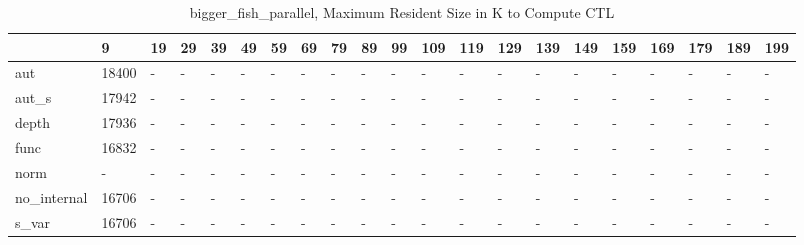 \begin{table}
\caption{bigger_fish_parallel, Maximum Resident Size in K to Compute CTL}
\label{bigger_fish_parallel_CTL_size}
\begin{tabular}{lllllllllllllllllllll}
\toprule
 & 9 & 19 & 29 & 39 & 49 & 59 & 69 & 79 & 89 & 99 & 109 & 119 & 129 & 139 & 149 & 159 & 169 & 179 & 189 & 199 \\
\midrule
aut & 18400 & - & - & - & - & - & - & - & - & - & - & - & - & - & - & - & - & - & - & - \\
aut_s & 17942 & - & - & - & - & - & - & - & - & - & - & - & - & - & - & - & - & - & - & - \\
depth & 17936 & - & - & - & - & - & - & - & - & - & - & - & - & - & - & - & - & - & - & - \\
func & 16832 & - & - & - & - & - & - & - & - & - & - & - & - & - & - & - & - & - & - & - \\
norm & - & - & - & - & - & - & - & - & - & - & - & - & - & - & - & - & - & - & - & - \\
no_internal & 16706 & - & - & - & - & - & - & - & - & - & - & - & - & - & - & - & - & - & - & - \\
s_var & 16706 & - & - & - & - & - & - & - & - & - & - & - & - & - & - & - & - & - & - & - \\
\bottomrule
\end{tabular}
\end{table}
